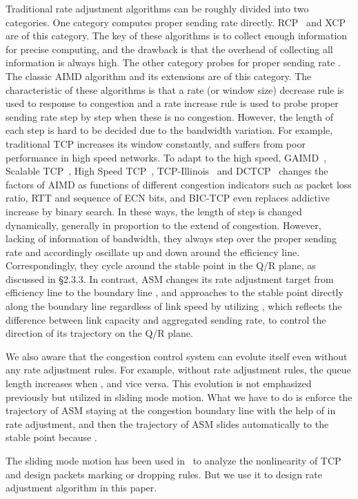 \documentclass{sig-alternate-10pt}
\begin{document}
Traditional rate adjustment algorithms can be roughly divided into two categories. One category computes proper sending rate directly. RCP~\cite{RCP} and XCP~\cite{XCP} are of this category. The key of these algorithms is to collect enough information for precise computing, and the drawback is that the overhead of collecting all information is always high. The other category probes for proper sending rate . The classic AIMD algorithm and its extensions are of this category. The characteristic of these algorithms is that a rate (or window size) decrease rule is used to response to congestion and a rate increase rule is used to probe proper sending rate step by step when these is no congestion. However, the length of each step is hard to be decided due to the bandwidth variation. For example, traditional TCP increases its window constantly, and suffers from poor performance in high speed networks. To adapt to the high speed, GAIMD~\cite{GAIMD}, Scalable TCP~\cite{S-TCP}, High Speed TCP~\cite{HS-TCP}, TCP-Illinois~\cite{illinois} and DCTCP~\cite{DCTCP} changes the factors of AIMD as functions of different congestion indicators such as packet loss ratio, RTT and sequence of ECN bits, and BIC-TCP even replaces addictive increase by binary search. In these ways, the length of step is changed dynamically, generally in proportion to the extend of congestion. However, lacking of information of bandwidth, they always step over the proper sending rate  and accordingly oscillate up and down around the efficiency line. Correspondingly, they cycle around the stable point in the Q/R plane, as discussed in \S2.3.3. In contrast, ASM changes its rate adjustment target from efficiency line  to the boundary line , and approaches to the stable point directly along the boundary line regardless of link speed by utilizing , which reflects the difference between link capacity and aggregated sending rate, to control the direction of its trajectory on the Q/R plane.



We also aware that the congestion control system can evolute itself even without any rate adjustment rules. For example, without rate adjustment rules, the queue length increases when , and vice versa. This evolution is not emphasized previously but utilized in sliding mode motion. What we have to do is enforce the trajectory of ASM staying at the congestion boundary line with the help of  in rate adjustment, and then the trajectory of ASM slides automatically to the stable point because . 


The sliding mode motion has been used in~\cite{SMVS, PengYan} to analyze the nonlinearity of TCP and design packets marking or dropping rules. But we use it to design rate adjustment algorithm in this paper. 
\end{document}
